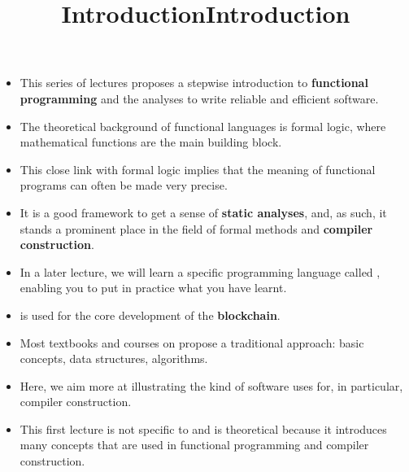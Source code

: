 \documentclass[wide]{slides}
\begin{document}
\maketitle

\begin{slide}
  \title{Introduction}

  \begin{itemize}

    \item This series of lectures proposes a stepwise introduction to
      \textbf{functional programming} and the analyses to write
      reliable and efficient software.

    \item The theoretical background of functional languages is formal
      logic, where mathematical functions are the main building block.

    \item This close link with formal logic implies that the meaning
      of functional programs can often be made very precise.

    \item It is a good framework to get a sense of \textbf{static
      analyses}, and, as such, it stands a prominent place in the
      field of formal methods and \textbf{compiler construction}.


  \end{itemize}
\end{slide}

\begin{slide}
  \title{Introduction}

  \begin{itemize}

    \item In a later lecture, we will learn a specific programming
      language called \textbf{\OCaml}, enabling you to put in practice
      what you have learnt.

    \item \OCaml is used for the core development of the \Tezos
      \textbf{blockchain}.

    \item Most textbooks and courses on \OCaml propose a traditional
      approach: basic concepts, data structures, algorithms.

    \item Here, we aim more at illustrating the kind of software
      \Tezos uses \OCaml for, in particular, compiler construction.

    \item This first lecture is not specific to \OCaml and is
      theoretical because it introduces many concepts that are used in
      functional programming and compiler construction.

  \end{itemize}

\end{slide}
\end{document}
